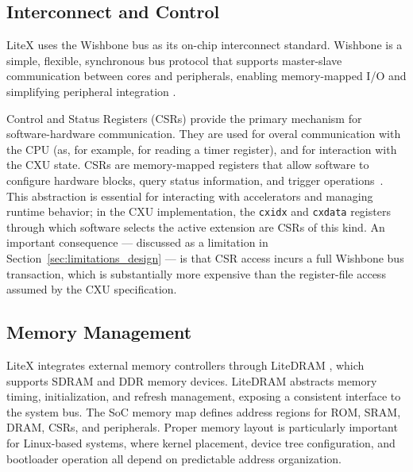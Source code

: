\subsection{Interconnect and Control}
\label{subsec:interconnect}

LiteX uses the Wishbone bus as its on-chip interconnect standard.
Wishbone is a simple, flexible, synchronous bus protocol that supports
master-slave communication between cores and peripherals, enabling memory-mapped I/O
and simplifying peripheral integration \cite{LiteXGitHub}.


Control and Status Registers (CSRs) provide the primary mechanism for software-hardware
communication. They are used for overal communication with the CPU
(as, for example, for reading  a timer register), and for interaction with the CXU state.
CSRs are memory-mapped registers that allow software to configure hardware blocks,
query status information, and trigger operations~\cite{LiteDramGithub, LiteXGitHub}.
This abstraction is essential for interacting with accelerators and managing runtime
behavior; in the CXU implementation, the \texttt{cxidx} and \texttt{cxdata} registers
through which software selects the active extension are CSRs of this kind.
An important consequence --- discussed as a limitation in
Section~\ref{sec:limitations_design} --- is that CSR access incurs a full Wishbone bus
transaction, which is substantially more expensive than the register-file access assumed
by the CXU specification.

\subsection{Memory Management}
\label{subsec:memory_mgmt}

LiteX integrates external memory controllers through LiteDRAM \cite{LiteDramGithub},
which supports SDRAM and DDR memory devices.
LiteDRAM abstracts memory timing, initialization, and refresh management, exposing a
consistent interface to the system bus.
The SoC memory map defines address regions for ROM, SRAM, DRAM, CSRs, and peripherals.
Proper memory layout is particularly important for Linux-based systems, where kernel
placement, device tree configuration, and bootloader operation all depend on predictable
address organization.

